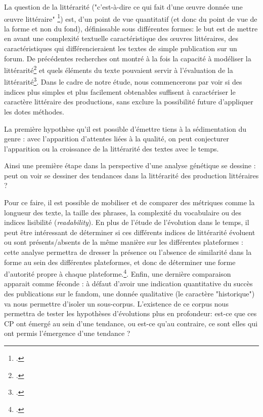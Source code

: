 \documentclass[12pt,a4paper,oneside,titlepage]{article} %
\begin{document}
	La question de la littérarité ("c'est-à-dire ce qui fait d'une œuvre donnée une œuvre littéraire" \footcite{aron_litterature_1984}) est, d'un point de vue quantitatif (et donc du point de vue de la forme et non du fond), définissable sous différentes formes: le but est de mettre en avant une complexité textuelle caractéristique des œuvres littéraires, des caractéristiques qui différencieraient les textes de simple publication sur un forum.
	De précédentes recherches ont montré à la fois la capacité à modéliser la littérarité\footcite{koolen_literary_2020} et quels éléments du texte pouvaient servir à l'évaluation de la littérarité\footcite{van_cranenburgh_identifying_2015}. Dans le cadre de notre étude, nous commencerons par voir si des indices plus simples et plus facilement obtenables suffisent à caractériser le caractère littéraire des productions, sans exclure la possibilité future d'appliquer les dotes méthodes.

	La première hypothèse qu'il est possible d'émettre tiens à la sédimentation du genre : avec l'apparition d'attentes liées à la qualité, on peut conjecturer l'apparition ou la croissance de la littérarité des textes avec le temps.
	

	Ainsi une première étape dans la perspective d'une analyse génétique se dessine : peut on voir se dessiner des tendances dans la littérarité des production littéraires ? 

	Pour ce faire, il est possible de mobiliser et de comparer des métriques comme la longueur des texte, la taille des phrases, la complexité du vocabulaire ou des indices lisibilité (\textit{readability}). 
	En plus de l'étude de l'évolution dans le temps, il peut être intéressant de déterminer si ces différents indices de littérarité évoluent ou sont présents/absents de la même manière sur les différentes plateformes : cette analyse permettra de dresser la présence ou l'absence de similarité dans la forme au sein des différentes plateformes, et donc de déterminer une forme d'autorité propre à chaque plateforme.\footcite{mayer_autorite_2017}. 
	Enfin, une dernière comparaison apparait comme féconde : à défaut d'avoir une indication quantitative du succès des publications sur le fandom, une donnée qualitative (le caractère "historique") va nous permettre d'isoler un sous-corpus.  L'existence de ce corpus nous permettra de tester les hypothèses d'évolutions plus en profondeur: est-ce que ces CP ont émergé au sein d'une tendance, ou est-ce qu'au contraire, ce sont elles qui ont permis l'émergence d'une tendance ? 
	
\end{document}
